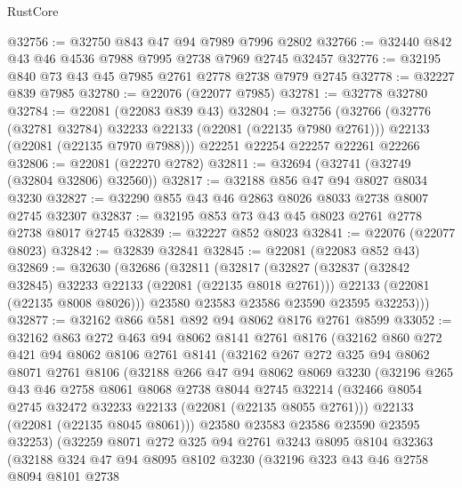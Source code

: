 \begin{lexlean}{RustCore}
\begin{coremodule}
@32756 := @32750 @843 @47 @94 @7989 @7996 @2802
@32766 := @32440 @842 @43 @46 @4536 @7988 @7995 @2738 @7969 @2745 @32457
@32776 := @32195 @840 @73 @43 @45 @7985 @2761 @2778 @2738 @7979 @2745
@32778 := @32227 @839 @7985
@32780 := @22076 (@22077 @7985)
@32781 := @32778 @32780
@32784 := @22081 (@22083 @839 @43)
@32804 := @32756
    (@32766
      (@32776 (@32781 @32784) @32233 @22133 (@22081 (@22135 @7980 @2761)))
      @22133
      (@22081 (@22135 @7970 @7988)))
    @22251
    @22254
    @22257
    @22261
    @22266
@32806 := @22081 (@22270 @2782)
@32811 := @32694 (@32741 (@32749 (@32804 @32806) @32560))
@32817 := @32188 @856 @47 @94 @8027 @8034 @3230
@32827 := @32290 @855 @43 @46 @2863 @8026 @8033 @2738 @8007 @2745 @32307
@32837 := @32195 @853 @73 @43 @45 @8023 @2761 @2778 @2738 @8017 @2745
@32839 := @32227 @852 @8023
@32841 := @22076 (@22077 @8023)
@32842 := @32839 @32841
@32845 := @22081 (@22083 @852 @43)
@32869 := @32630
    (@32686
      (@32811
        (@32817
          (@32827
            (@32837 (@32842 @32845) @32233 @22133 (@22081 (@22135 @8018 @2761)))
            @22133
            (@22081 (@22135 @8008 @8026)))
          @23580
          @23583
          @23586
          @23590
          @23595
          @32253)))
@32877 := @32162 @866 @581 @892 @94 @8062 @8176 @2761 @8599
@33052 := @32162
    @863
    @272
    @463
    @94
    @8062
    @8141
    @2761
    @8176
    (@32162
      @860
      @272
      @421
      @94
      @8062
      @8106
      @2761
      @8141
      (@32162
        @267
        @272
        @325
        @94
        @8062
        @8071
        @2761
        @8106
        (@32188
          @266
          @47
          @94
          @8062
          @8069
          @3230
          (@32196
            @265
            @43
            @46
            @2758
            @8061
            @8068
            @2738
            @8044
            @2745
            @32214
            (@32466 @8054 @2745 @32472 @32233 @22133 (@22081 (@22135 @8055 @2761)))
            @22133
            (@22081 (@22135 @8045 @8061)))
          @23580
          @23583
          @23586
          @23590
          @23595
          @32253)
        (@32259
          @8071
          @272
          @325
          @94
          @2761
          @3243
          @8095
          @8104
          @32363
          (@32188
            @324
            @47
            @94
            @8095
            @8102
            @3230
            (@32196
              @323
              @43
              @46
              @2758
              @8094
              @8101
              @2738

\end{coremodule}
\end{lexlean}
